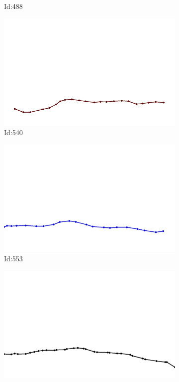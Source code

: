 \documentclass[12pt,twoside]{report}
\begin{document}
\begin{figure}
\begin{subfigure}[b]{0.20\textwidth}
\caption{Id:488}
\end{subfigure}
\begin{subfigure}[b]{0.20\textwidth}
\centering
\includegraphics[width=\textwidth]{../trajectories/540.png}
\caption{Id:540}
\end{subfigure}
\begin{subfigure}[b]{0.20\textwidth}
\centering
\includegraphics[width=\textwidth]{../trajectories/553.png}
\caption{Id:553}
\end{subfigure}
\begin{subfigure}[b]{0.20\textwidth}
\centering
\includegraphics[width=\textwidth]{../trajectories/563.png}

\end{subfigure}
\end{figure}
\end{document}
